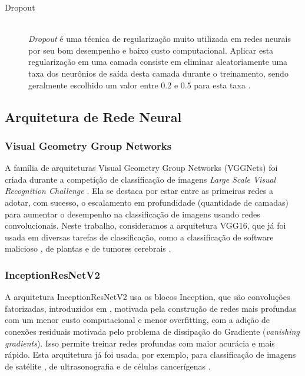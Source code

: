 \begin{description}
  \item[Dropout]
        \hfill \\
        \emph{Dropout} \cite{dropout} é uma técnica de regularização muito utilizada em redes neurais por seu bom desempenho e baixo custo computacional. Aplicar esta regularização em uma camada consiste em eliminar aleatoriamente uma taxa dos neurônios de saída desta camada durante o treinamento, sendo geralmente escolhido um valor entre 0.2 e 0.5 para esta taxa \cite{CholletBook}.
\end{description}












\subsection{Arquitetura de Rede Neural}
\label{sec:arch}

\subsubsection{Visual Geometry Group Networks}
\label{sec:vgg}
A família de arquiteturas Visual Geometry Group Networks (VGGNets) \cite{VGG16} foi criada durante a competição de classificação de imagens \textit{Large Scale Visual Recognition Challenge} \cite{ILSVRC15}. Ela se destaca por estar entre as primeiras redes a adotar, com sucesso, o escalamento em profundidade (quantidade de camadas) para aumentar o desempenho na classificação de imagens usando redes convolucionais. Neste trabalho, consideramos a arquitetura VGG16, que já foi usada em diversas tarefas de classificação, como a classificação de software malicioso \cite{VGG16Ex01}, de plantas \cite{VGG16Ex02} e de tumores cerebrais \cite{VGG16Ex03}.

\subsubsection{InceptionResNetV2}
\label{sec:inceptionresnetv2}
A arquitetura InceptionResNetV2 \cite{InceptionResNetv2} usa os blocos Inception, que são convoluções fatorizadas, introduzidos em \cite{Inception}, motivada pela construção de redes mais profundas com um menor custo computacional e menor overfitting, com a adição de conexões residuais \cite{ResNet} motivada pelo problema de dissipação do Gradiente (\textit{vanishing gradients}). Isso permite treinar redes profundas com maior acurácia e mais rápido. Esta arquitetura já foi usada, por exemplo, para classificação de imagens de satélite \cite{InceptionResNetV2Ex01}, de ultrasonografia \cite{InceptionResNetV2Ex02} e de células cancerígenas \cite{InceptionResNetV2Ex03}.


